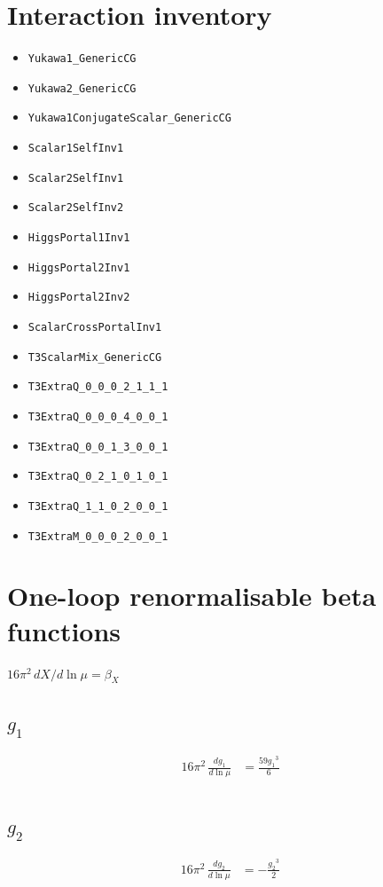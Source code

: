 \documentclass[10pt,a4paper]{article}
\begin{document}
\section*{Interaction inventory}
\begin{itemize}
\item \texttt{Yukawa1\_GenericCG}
\item \texttt{Yukawa2\_GenericCG}
\item \texttt{Yukawa1ConjugateScalar\_GenericCG}
\item \texttt{Scalar1SelfInv1}
\item \texttt{Scalar2SelfInv1}
\item \texttt{Scalar2SelfInv2}
\item \texttt{HiggsPortal1Inv1}
\item \texttt{HiggsPortal2Inv1}
\item \texttt{HiggsPortal2Inv2}
\item \texttt{ScalarCrossPortalInv1}
\item \texttt{T3ScalarMix\_GenericCG}
\item \texttt{T3ExtraQ\_0\_0\_0\_2\_1\_1\_1}
\item \texttt{T3ExtraQ\_0\_0\_0\_4\_0\_0\_1}
\item \texttt{T3ExtraQ\_0\_0\_1\_3\_0\_0\_1}
\item \texttt{T3ExtraQ\_0\_2\_1\_0\_1\_0\_1}
\item \texttt{T3ExtraQ\_1\_1\_0\_2\_0\_0\_1}
\item \texttt{T3ExtraM\_0\_0\_0\_2\_0\_0\_1}
\end{itemize}
\clearpage
\section*{One-loop renormalisable beta functions}
$16\pi^2\,dX/d\ln\mu=\beta_X$
\subsection*{$g_1$}
\begin{align*}
16\pi^2\,\frac{d g_1}{d\ln\mu} &=\frac{59 {g_1}^3}{6} \\
\end{align*}
\subsection*{$g_2$}
\begin{align*}
16\pi^2\,\frac{d g_2}{d\ln\mu} &=-\frac{{g_2}^3}{2} \\
\end{align*}
\end{document}
